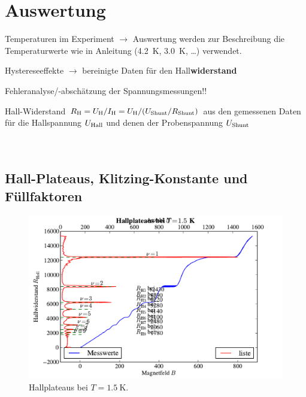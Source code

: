 \documentclass[paper=a4,fontsize=10pt,DIV=18,twocolumn,parskip=half]{scrartcl}
\numberwithin{equation}{section}    %
\begin{document}
%
\section{Auswertung}
\label{Auswertung}
%


\begin{compactitem}
	\item Temperaturen im Experiment $\rightarrow$ Auswertung werden zur Beschreibung die Temperaturwerte wie in Anleitung (\SI{4.2}{\kelvin}, \SI{3.0}{\kelvin}, \dots) verwendet.
	\item Hystereseeffekte $\rightarrow$ bereinigte Daten für den Hall\textbf{widerstand}
	\item Fehleranalyse/-abschätzung der Spannungsmessungen!!
\end{compactitem}

Hall-Widerstand $R_{\rm H}=U_{\rm H}/I_{\rm H} = U_{\rm H}/(U_{\rm Shunt}/R_{\rm Shunt})$ aus den gemessenen Daten für die Hallspannung $U_{\rm Hall}$ und denen der Probenspannung $U_{\rm Shunt}$
% 
~~~~~~~~~~~~~~~~~~~~~~~~~~~~~~~~~~~~~~~~~~~~~~~~~~~~~~~~~~~~~~~~~~~~~~~~~~~~~
\subsection{Hall-Plateaus, Klitzing-Konstante und Füllfaktoren}
\label{a1}

\begin{figure}[htp]
	\begin{center}
		\includegraphics[width=\columnwidth]{Data-Plots/05-1,5-Hallplateaus.pdf}
		\caption{Hallplateaus bei $T=\SI{1.5}{\kelvin}$.}
		\label{hallplateau}
	\end{center}
\end{figure}
\end{document}
